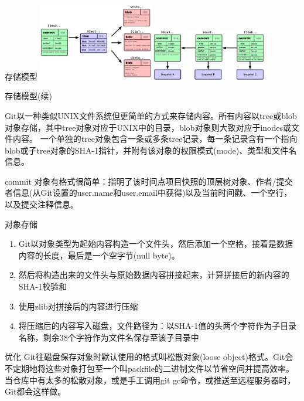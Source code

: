 \documentclass[CJK, 10pt]{beamer}
\begin{document}
\begin{CJK*}{UTF8}{gbsn}
\begin{frame}{存储模型}
    \includegraphics[width=5cm]{commit-ds.png} \hfill \includegraphics[width=5cm]{commit-links.png}
\end{frame}

\begin{frame}{存储模型(续)}
    \begin{block}{}
        Git以一种类似UNIX文件系统但更简单的方式来存储内容。所有内容以tree或blob对象存储，其中tree对象对应于UNIX中的目录，blob对象则大致对应于inodes或文件内容。
        一个单独的tree对象包含一条或多条tree记录，每一条记录含有一个指向blob或子tree对象的SHA-1指针，并附有该对象的权限模式(mode)、类型和文件名信息。
    \end{block}
    \begin{block}{}
        commit 对象有格式很简单：指明了该时间点项目快照的顶层树对象、作者/提交者信息(从Git设置的user.name和user.email中获得)以及当前时间戳、一个空行，
        以及提交注释信息。
    \end{block}
    \begin{block}{对象存储}
        \begin{enumerate}
            \item Git以对象类型为起始内容构造一个文件头，然后添加一个空格，接着是数据内容的长度，最后是一个空字节(null byte)。
            \item 然后将构造出来的文件头与原始数据内容拼接起来，计算拼接后的新内容的SHA-1校验和
            \item 使用zlib对拼接后的内容进行压缩
            \item 将压缩后的内容写入磁盘，文件路径为：以SHA-1值的头两个字符作为子目录名称，剩余38个字符作为文件名保存至该子目录中
        \end{enumerate}
    \end{block}
    \begin{block}{优化}
        Git往磁盘保存对象时默认使用的格式叫松散对象(loose object)格式。Git会不定期地将这些对象打包至一个叫packfile的二进制文件以节省空间并提高效率。
        当仓库中有太多的松散对象，或是手工调用git gc命令，或推送至远程服务器时，Git都会这样做。
    \end{block}
\end{frame}


\end{CJK*}
\end{document}
